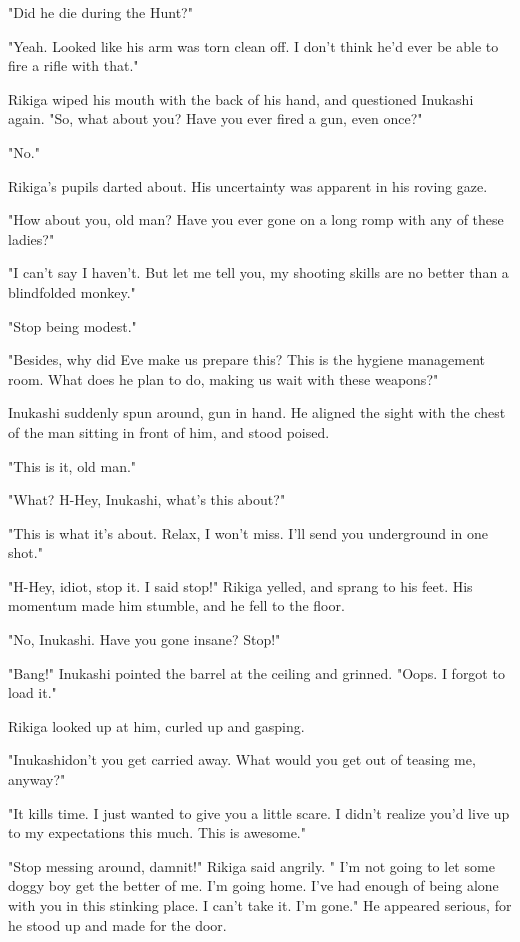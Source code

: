 "Did he die during the Hunt?"

"Yeah. Looked like his arm was torn clean off. I don't think he'd ever
be able to fire a rifle with that."

Rikiga wiped his mouth with the back of his hand, and questioned
Inukashi again. "So, what about you? Have you ever fired a gun, even
once?"

"No."

Rikiga's pupils darted about. His uncertainty was apparent in his roving
gaze.

"How about you, old man? Have you ever gone on a long romp with any of
these ladies?"

"\el I can't say I haven't. But let me tell you, my shooting skills are
no better than a blindfolded monkey."

"Stop being modest."

"Besides, why did Eve make us prepare this? This is the hygiene
management room. What does he plan to do, making us wait with these
weapons?"

Inukashi suddenly spun around, gun in hand. He aligned the sight with
the chest of the man sitting in front of him, and stood poised.

"This is it, old man."

"What? H-Hey, Inukashi, what's this about?"

"This is what it's about. Relax, I won't miss. I'll send you underground
in one shot."

"H-Hey, idiot, stop it. I said stop!" Rikiga yelled, and sprang to his
feet. His momentum made him stumble, and he fell to the floor.

"No, Inukashi. Have you gone insane? Stop!"

"Bang!" Inukashi pointed the barrel at the ceiling and grinned. "Oops. I
forgot to load it."

Rikiga looked up at him, curled up and gasping.

"Inukashi\el don't you get carried away. What would you get out of
teasing me, anyway?"

"It kills time. I just wanted to give you a little scare. I didn't
realize you'd live up to my expectations this much. This is awesome."

"Stop messing around, damnit!" Rikiga said angrily. " I'm not going to
let some doggy boy get the better of me. I'm going home. I've had enough
of being alone with you in this stinking place. I can't take it. I'm
gone." He appeared serious, for he stood up and made for the door.

